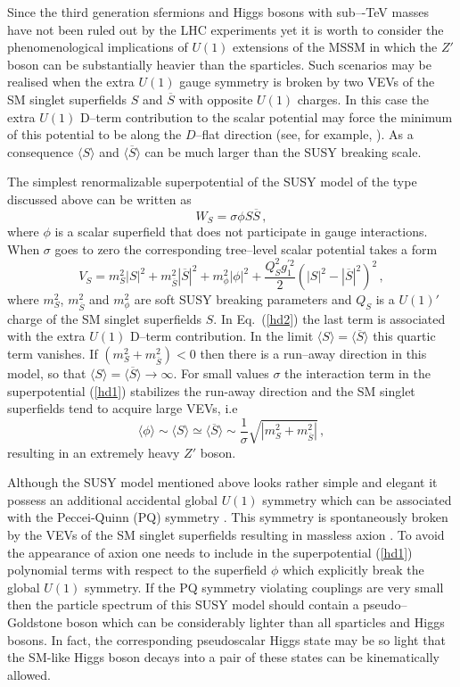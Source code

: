 \documentclass[12pt,a4paper]{article}
\newcommand{\be}{\begin{equation}}
\newcommand{\ee}{\end{equation}}
\newcommand{\ds}{\displaystyle}
\begin{document}
 Since the third generation sfermions and Higgs bosons with sub–-TeV
 masses have not been ruled out by the LHC experiments yet it is worth
 to consider the phenomenological implications of $U(1)$
 extensions of the MSSM in which the $Z'$ boson can be substantially
 heavier than the sparticles. Such scenarios may be realised when the
 extra $U(1)$ gauge symmetry is broken by two VEVs of the SM singlet
 superfields $S$ and $\overline{S}$ with opposite $U(1)$ charges.  In
 this case the extra $U(1)$ D--term contribution to the scalar
 potential may force the minimum of this potential to be along the
 $D$--flat direction (see, for example, \cite{Kolda:1995iw}).  As a
 consequence $\langle S\rangle$ and $\langle\overline{S}\rangle$ can
 be much larger than the SUSY breaking scale.

The simplest renormalizable superpotential of the SUSY model of the type discussed above
can be written as
\be
W_S=\sigma \phi S \overline{S}\,,
\label{hd1}
\ee
where $\phi$ is a scalar superfield that does not participate in gauge interactions. When
$\sigma$ goes to zero the corresponding tree--level scalar potential takes a form
\begin{equation}
V_S = m^2_S |S|^2 + m^2_{\overline{S}} |\overline{S}|^2 + m^2_{\phi} |\phi|^2
+\ds\frac{Q_S^2 g^{'2}_1}{2}\left(|S|^2-|\overline{S}|^2\right)^2\,,
\label{hd2}
\end{equation}
where $m_S^2$, $m^2_{\overline{S}}$ and $m^2_{\phi}$ are soft SUSY breaking
parameters and $Q_S$ is a $U(1)'$ charge of the SM singlet superfields $S$. In Eq.~(\ref{hd2})
the last term is associated with the extra $U(1)$ D--term contribution. In the limit
$\langle S \rangle = \langle \overline{S} \rangle$ this quartic term vanishes. If
$(m^2_S + m^2_{\overline{S}})<0$ then there is a run--away direction in this
model, so that $\langle S \rangle = \langle \overline{S} \rangle \to \infty$.
For small values $\sigma$ the interaction term in the superpotential (\ref{hd1}) stabilizes
the run-away direction and the SM singlet superfields tend to acquire large VEVs,
i.e
\be
\langle \phi \rangle \sim \langle S \rangle \simeq \langle \overline{S} \rangle
\sim \dfrac{1}{\sigma}\sqrt{|m^2_S + m^2_{\overline{S}}|}\,,
\label{hd3}
\ee
resulting in an extremely heavy $Z'$ boson.

Although the SUSY model mentioned above looks rather simple and elegant it
possess an additional accidental global $U(1)$ symmetry which can be
associated with the Peccei-Quinn (PQ) symmetry \cite{Peccei:1977hh}.
This symmetry is spontaneously broken by the VEVs of the SM singlet superfields
resulting in massless axion \cite{axion}. To avoid the appearance of axion
one needs to include in the superpotential (\ref{hd1}) polynomial terms with respect
to the superfield $\phi$ which explicitly break the global $U(1)$ symmetry. If the PQ
symmetry violating couplings are very small then the particle spectrum of this
SUSY model should contain a pseudo--Goldstone boson which can be considerably
lighter than all sparticles and Higgs bosons. In fact, the corresponding pseudoscalar
Higgs state may be so light that the SM-like Higgs boson decays into a pair of
these states can be kinematically allowed.
\end{document}
